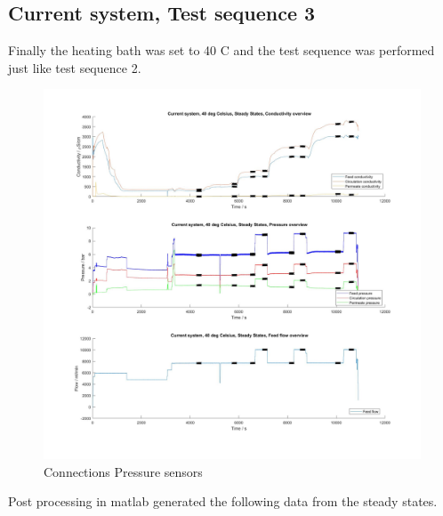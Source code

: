 \newpage

\subsection{Current system, Test sequence 3}

Finally the heating bath was set to 40 C and the test sequence was performed just like test sequence 2. 

\begin{figure}[H]
    \centering
    \includegraphics[width=1.1\textwidth]{overview40}
    \caption{Connections Pressure sensors}
    \label{fig:PressConn}
\end{figure}

\newpage

Post processing in matlab generated the following data from the steady states.

